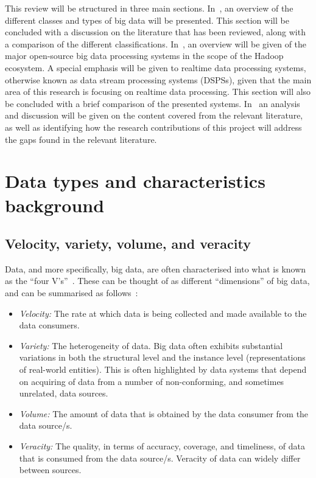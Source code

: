 This review will be structured in three main sections. In~, an overview of the
different classes and types of big data will be presented. This section will be concluded with a discussion on the
literature that has been reviewed, along with a comparison of the different classifications.
In~, an overview will be given of the major open-source big data processing
systems in the scope of the Hadoop ecosystem. A special emphasis will be given to realtime data processing systems,
otherwise known as data stream processing systems (DSPSs), given that the main area of this research is focusing on
realtime data processing. This section will also be concluded with a brief comparison of the presented systems.
In~ an analysis and discussion will be given on the content covered from the relevant
literature, as well as identifying how the research contributions of this project will address the gaps found in the
relevant literature.


\newpage


\section{Data types and characteristics background} %
\label{sec:big_data_types_background}

\subsection{Velocity, variety, volume, and veracity} %
\label{sub:four_v}

Data, and more specifically, big data, are often characterised into what is known as the ``four
V's''~\cite{wang2014bigdatabench}. These can be thought of as different ``dimensions'' of big data, and can be
summarised as follows~\cite{dong2013big}:

\begin{itemize}
  \item \emph{Velocity:} The rate at which data is being collected and made available to the data consumers.
  \item \emph{Variety:} The heterogeneity of data. Big data often exhibits substantial variations in both the structural
  level and the instance level (representations of real-world entities). This is often highlighted by data systems that
  depend on acquiring of data from a number of non-conforming, and sometimes unrelated, data sources.
  \item \emph{Volume:} The amount of data that is obtained by the data consumer from the data source/s.
  \item \emph{Veracity:} The quality, in terms of accuracy, coverage, and timeliness, of data that is consumed from
  the data source/s. Veracity of data can widely differ between sources.
\end{itemize}

